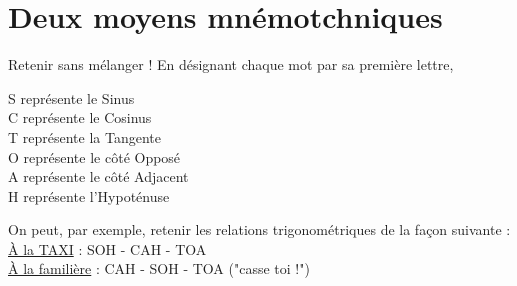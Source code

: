 \section{Deux moyens mnémotchniques}
\begin{center}
    \begin{myBox}{Retenir sans mélanger !}
        En désignant chaque mot par sa première lettre,\\
        \begin{multicols}{2}
            S représente le Sinus\\
            C représente le Cosinus\\
            T représente la Tangente\\
            O représente le côté Opposé\\
            A représente le côté Adjacent\\
            H représente l'Hypoténuse\\        
        \end{multicols}
        
        \bigskip
        On peut, par exemple, retenir les relations trigonométriques de la fa\c con suivante :\\
        \underline{À la TAXI} : SOH - CAH - TOA\\
        \underline{À la familière} : CAH - SOH - TOA ("casse toi !")        
    \end{myBox}
\end{center}
